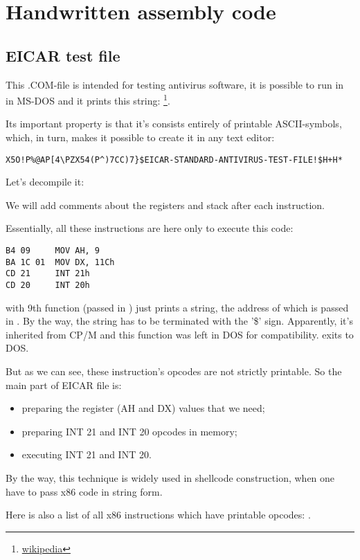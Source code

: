 \section{Handwritten assembly code}

\subsection{ EICAR test file}
\label{subsec:EICAR}

This .COM-file is intended for testing antivirus software, it is possible to run in
in MS-DOS and it prints this string: 
\footnote{\href{http://go.yurichev.com/17006}{wikipedia}}.

Its important property is that it's consists entirely of printable 
ASCII-symbols, which, in turn, makes it possible to create it in any text editor:

\begin{lstlisting}
X5O!P%@AP[4\PZX54(P^)7CC)7}$EICAR-STANDARD-ANTIVIRUS-TEST-FILE!$H+H*
\end{lstlisting}

Let's decompile it:



We will add comments about the registers and stack after each instruction.

Essentially, all these
instructions are here only to execute this code:

\begin{lstlisting}
B4 09     MOV AH, 9
BA 1C 01  MOV DX, 11Ch
CD 21     INT 21h
CD 20     INT 20h
\end{lstlisting}

 with 9th
function (passed in ) just prints a string, the address of which is passed in .
By the way, the string has to be terminated
with the '\$' sign.
Apparently, it's inherited from \gls{CP/M} 
and this function was left in DOS for compatibility.
 exits to DOS.

But as we can see, these instruction's
opcodes are not strictly printable.
So the main part of EICAR file is:

\begin{itemize}
\item preparing the register (AH and DX) values that we need;
\item preparing INT 21 and INT 20 opcodes in memory;
\item executing INT 21 and INT 20.
\end{itemize}


By the way, this technique is widely used in shellcode construction, when one have to pass x86 code
in string form.

Here is also a list of all 
x86 instructions which have printable opcodes: .

